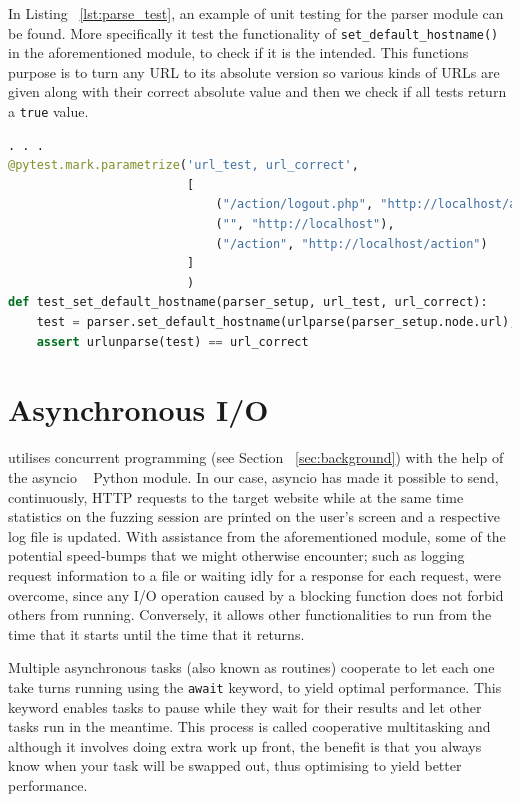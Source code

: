 In Listing ~\ref{lst:parse_test}, an example of unit testing for the parser module can be found. More specifically it test the functionality of {\tt set\_default\_hostname()} in the aforementioned module, to check if it is the intended. This functions purpose is to turn any URL to its absolute version so various kinds of URLs are given along with their correct absolute value and then we check if all tests return a {\tt true} value.

\begin{lstlisting}[aboveskip=\baselineskip, showstringspaces=false, frame=single, language=Python, columns=flexible, keepspaces=true, caption={\textit{Unit test for method set\_default\_hostname()}}, numberstyle=\color{gray}, numbersep=5pt, label={lst:parse_test}]
. . . 
@pytest.mark.parametrize('url_test, url_correct',
                         [
                             ("/action/logout.php", "http://localhost/action/logout.php"),
                             ("", "http://localhost"),
                             ("/action", "http://localhost/action")
                         ]
                         )
def test_set_default_hostname(parser_setup, url_test, url_correct):
    test = parser.set_default_hostname(urlparse(parser_setup.node.url), urlparse(url_test))
    assert urlunparse(test) == url_correct
\end{lstlisting}

\section{Asynchronous I/O}
\pname{} utilises concurrent programming (see Section ~\ref{sec:background}) with the help of the asyncio ~\cite{asyncio} Python module. In our case, asyncio has made it possible to send, continuously, HTTP requests to the target website while at the same time statistics on the fuzzing session are printed on the user's screen and a respective log file is updated. With assistance from the aforementioned module, some of the potential speed-bumps that we might otherwise encounter; such as logging request information to a file or waiting idly for a response for each request, were overcome, since any I/O operation caused by a blocking function does not forbid others from running. Conversely, it allows other functionalities to run from the time that it starts until the time that it returns. 

Multiple asynchronous tasks (also known as routines) cooperate to let each one take turns running using the {\tt await} keyword, to yield optimal performance. This keyword enables tasks to pause while they wait for their results and let other tasks run in the meantime. This process is called cooperative multitasking and although it involves doing extra work up front, the benefit is that you always know when your task will be swapped out, thus optimising to yield better performance.

